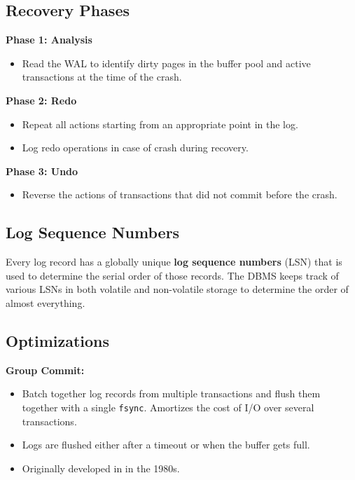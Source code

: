 \documentclass[11pt]{article}
\begin{document}
\subsection{Recovery Phases}

\textbf{Phase 1: Analysis}
\begin{itemize}
    \item
    Read the WAL to identify dirty pages in the buffer pool and active transactions at the time of 
    the crash.
\end{itemize}

\textbf{Phase 2: Redo}
\begin{itemize}
    \item
    Repeat all actions starting from an appropriate point in the log.
    
    \item
    Log redo operations in case of crash during recovery.
\end{itemize}

\textbf{Phase 3: Undo}
\begin{itemize}
    \item
    Reverse the actions of transactions that did not commit before the crash.
\end{itemize}

\subsection{Log Sequence Numbers}
Every log record has a globally unique \textbf{log sequence numbers} (LSN) that is used to 
determine the serial order of those records.
The DBMS keeps track of various LSNs in both volatile and non-volatile storage to 
determine the order of almost everything.

\subsection{Optimizations}
\textbf{Group Commit:}
\begin{itemize}
    \item
    Batch together log records from multiple transactions and flush them together with a single 
    \texttt{fsync}. Amortizes the cost of I/O over several transactions.

    \item
    Logs are flushed either after a timeout or when the buffer gets full.
    
    \item
    Originally developed in  in the 1980s.
\end{itemize}
\end{document}

